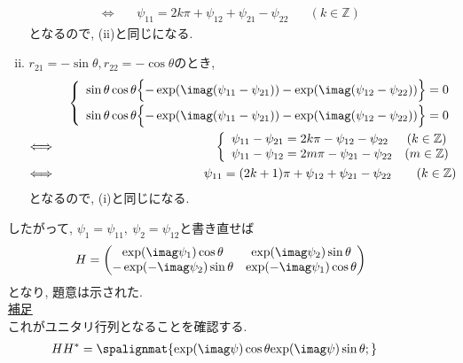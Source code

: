 \begin{enumerate}[(1)]
\begin{enumerate}[(i)]
\begin{eqnarray*}
        \Longleftrightarrow\ && \psi_{11}=2k\pi+\psi_{12}+\psi_{21}-\psi_{22}\hspace{20pt} (k\in\mathbb{Z})
      \end{eqnarray*}
      となるので, (ii)と同じになる.
    \item $r_{21}=-\sin\theta,r_{22}=-\cos\theta$のとき,
      \begin{eqnarray*}
        &&\left\{
        \begin{array}{l}
          \sin\theta\cos\theta\Bigl\{-\exp(\imag(\psi_{11}-\psi_{21}))-\exp(\imag(\psi_{12}-\psi_{22}))\Bigr\}=0\\[0.2cm]
          \sin\theta\cos\theta\Bigl\{-\exp(\imag(\psi_{11}-\psi_{21}))-\exp(\imag(\psi_{12}-\psi_{22}))\Bigr\}=0
        \end{array}
        \right.\\
        \Longleftrightarrow\ &&\left\{
                                \begin{array}{lc}
                                  \psi_{11}-\psi_{21}=2k\pi -\psi_{12}-\psi_{22}&(k\in\mathbb{Z})\\
                                  \psi_{11}-\psi_{12}=2m\pi-\psi_{21}-\psi_{22}&(m\in\mathbb{Z})\\
                                \end{array}
        \right.\\
        \Longleftrightarrow\ && \psi_{11}=(2k+1)\pi+\psi_{12}+\psi_{21}-\psi_{22}\hspace{20pt} (k\in\mathbb{Z})
      \end{eqnarray*}
      となるので, (i)と同じになる.\\
    \end{enumerate}
    したがって, $\psi_{1}=\psi_{11},\ \psi_{2}=\psi_{12}$と書き直せば
    \begin{eqnarray*}
      H=\begin{pmatrix}\exp(\imag\psi_{1})\cos\theta&\exp(\imag\psi_{2})\sin\theta\\-\exp(-\imag\psi_{2})\sin\theta&\exp(-\imag\psi_{1})\cos\theta\end{pmatrix}
    \end{eqnarray*}
    となり, 題意は示された.\\[0.2cm]
    \underline{補足}\\
    これがユニタリ行列となることを確認する.
    \begin{align*}
        HH^{\ast} & = 
        \spalignmat{
            {\exp(\imag \psi)\cos\theta} {\exp(\imag \psi)\sin\theta};
}
\end{align*}
\end{enumerate}
